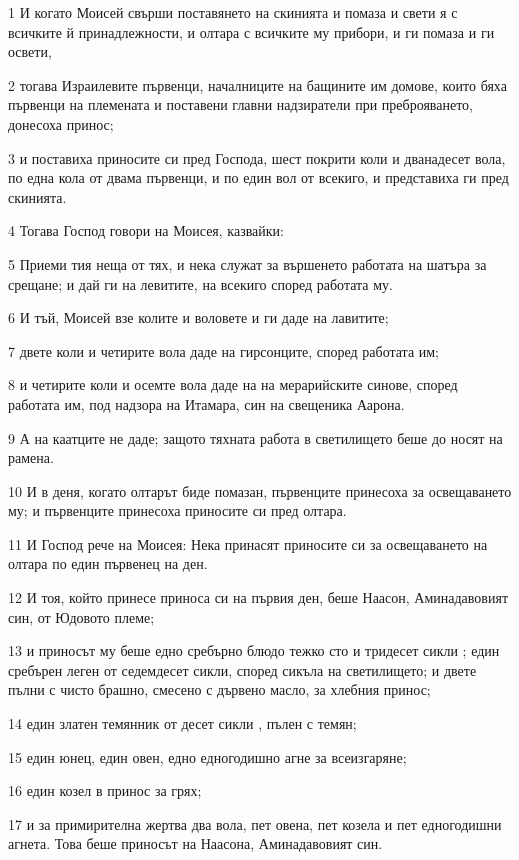\par 1 И когато Моисей свърши поставянето на скинията и помаза и свети я с всичките й принадлежности, и олтара с всичките му прибори, и ги помаза и ги освети,
\par 2 тогава Израилевите първенци, началниците на бащините им домове, които бяха първенци на племената и поставени главни надзиратели при преброяването, донесоха принос;
\par 3 и поставиха приносите си пред Господа, шест покрити коли и дванадесет вола, по една кола от двама първенци, и по един вол от всекиго, и представиха ги пред скинията.
\par 4 Тогава Господ говори на Моисея, казвайки:
\par 5 Приеми тия неща от тях, и нека служат за вършенето работата на шатъра за срещане; и дай ги на левитите, на всекиго според работата му.
\par 6 И тъй, Моисей взе колите и воловете и ги даде на лавитите;
\par 7 двете коли и четирите вола даде на гирсонците, според работата им;
\par 8 и четирите коли и осемте вола даде на на мерарийските синове, според работата им, под надзора на Итамара, син на свещеника Аарона.
\par 9 А на каатците не даде; защото тяхната работа в светилището беше до носят на рамена.
\par 10 И в деня, когато олтарът биде помазан, първенците принесоха за освещаването му; и първенците принесоха приносите си пред олтара.
\par 11 И Господ рече на Моисея: Нека принасят приносите си за освещаването на олтара по един първенец на ден.
\par 12 И тоя, който принесе приноса си на първия ден, беше Наасон, Аминадавовият син, от Юдовото племе;
\par 13 и приносът му беше едно сребърно блюдо тежко сто и тридесет сикли ; един сребърен леген от седемдесет сикли, според сикъла на светилището; и двете пълни с чисто брашно, смесено с дървено масло, за хлебния принос;
\par 14 един златен темянник от десет сикли , пълен с темян;
\par 15 един юнец, един овен, едно едногодишно агне за всеизгаряне;
\par 16 един козел в принос за грях;
\par 17 и за примирителна жертва два вола, пет овена, пет козела и пет едногодишни агнета. Това беше приносът на Наасона, Аминадавовият син.

